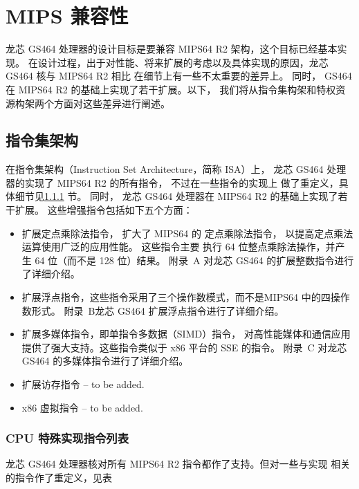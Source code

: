 \chapter{MIPS 兼容性}

龙芯 GS464 处理器的设计目标是要兼容 MIPS64 R2 架构，这个目标已经基本实现。
在设计过程，出于对性能、将来扩展的考虑以及具体实现的原因，龙芯 GS464 核与 MIPS64 R2 相比
在细节上有一些不太重要的差异上。 同时， GS464 在 MIPS64 R2 的基础上实现了若干扩展。以下，
我们将从指令集构架和特权资源构架两个方面对这些差异进行阐述。

\section{指令集架构}

在指令集架构（Instruction Set Architecture，简称 ISA）上，
龙芯 GS464 处理器的实现了 MIPS64 R2 的所有指令， 不过在一些指令的实现上
做了重定义，具体细节见\ref{sec:gsSpecialInstruction} 节。
同时， 龙芯 GS464 处理器在 MIPS64 R2 的基础上实现了若干扩展。
这些增强指令包括如下五个方面：
\begin{itemize}
  \item 扩展定点乘除法指令， 扩大了 MIPS64 的 定点乘除法指令，
    以提高定点乘法运算使用广泛的应用性能。 这些指令主要 执行 64
    位整点乘除法操作，并产生 64 位（而不是 128 位）结果。 附录~A
    对龙芯 GS464 的扩展整数指令进行了详细介绍。
  \item 扩展浮点指令，这些指令采用了三个操作数模式，而不是MIPS64
    中的四操作数形式。 附录~B龙芯 GS464 扩展浮点指令进行了详细介绍。
  \item 扩展多媒体指令，即单指令多数据（SIMD）指令，
    对高性能媒体和通信应用提供了强大支持。这些指令类似于 x86 平台的 SSE
    的指令。 附录~C 对龙芯 GS464 的多媒体指令进行了详细介绍。
  \item 扩展访存指令 -- to be added.
  \item x86 虚拟指令 -- to be added.
\end{itemize}

\subsection{CPU 特殊实现指令列表}\label{sec:gsSpecialInstruction}

龙芯 GS464 处理器核对所有 MIPS64 R2 指令都作了支持。但对一些与实现
相关的指令作了重定义，见表

